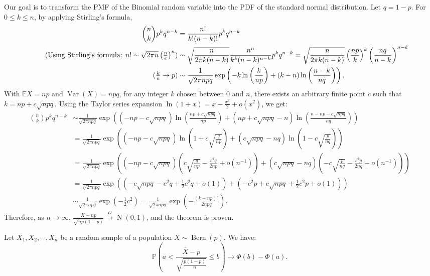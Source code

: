 \documentclass{huhtakm-template-book-v2}
\newcommand{\prob}{\mathbb{P}}
\newcommand{\expect}{\mathbb{E}}
\DeclareMathOperator{\Bern}{Bern}
\DeclareMathOperator{\N}{N}
\DeclareMathOperator{\Var}{Var}
\begin{document}
    \begin{proofing}
        Our goal is to transform the PMF of the Binomial random variable into the PDF of the standard normal distribution. Let $q = 1-p$. For $0 \leq k \leq n$, by applying Stirling's formula,
        \begin{align*}
            \binom{n}{k}p^{k}q^{n-k} &= \frac{n!}{k!(n-k)!}p^{k}q^{n-k}\\
            \tag{Using Stirling's formula: $n! \sim \sqrt{2\pi n}\left(\frac{n}{e}\right)^{n}$}
            &\sim \sqrt{\frac{n}{2\pi k(n-k)}}\frac{n^{n}}{k^{k}(n-k)^{n-k}}p^{k}q^{n-k} = \sqrt{\frac{n}{2\pi k(n-k)}}\left(\frac{np}{k}\right)^{k}\left(\frac{nq}{n-k}\right)^{n-k}\\
            \tag{$\frac{k}{n} \to p$}
            &\sim \frac{1}{\sqrt{2\pi npq}}\exp\left(-k\ln\left(\frac{k}{np}\right)+(k-n)\ln\left(\frac{n-k}{nq}\right)\right).
        \end{align*}
        With $\expect{X} = np$ and $\Var(X) = npq$, for any integer $k$ chosen between $0$ and $n$, there exists an arbitrary finite point $c$ such that $k = np+c\sqrt{npq}$. Using the Taylor series expansion $\ln(1+x) = x-\frac{x^{2}}{2}+o(x^{2})$, we get:
        \begin{align*}
            \binom{n}{k}p^{k}q^{n-k} &\sim \frac{1}{\sqrt{2\pi npq}}\exp\left((-np-c\sqrt{npq})\ln\left(\frac{np+c\sqrt{npq}}{np}\right)+(np+c\sqrt{npq}-n)\ln\left(\frac{n-np-c\sqrt{npq}}{nq}\right)\right)\\
            &= \frac{1}{\sqrt{2\pi npq}}\exp\left((-np-c\sqrt{npq})\ln\left(1+c\sqrt{\frac{q}{np}}\right)+(c\sqrt{npq}-nq)\ln\left(1-c\sqrt{\frac{p}{nq}}\right)\right)\\
            &= \frac{1}{\sqrt{2\pi npq}}\exp\left((-np-c\sqrt{npq})\left(c\sqrt{\frac{q}{np}}-\frac{c^{2}q}{2np}+o(n^{-1})\right)+(c\sqrt{npq}-nq)\left(-c\sqrt{\frac{p}{nq}}-\frac{c^{2}p}{2nq}+o(n^{-1})\right)\right)\\
            &= \frac{1}{\sqrt{2\pi npq}}\exp\left((-c\sqrt{npq}-c^{2}q+\frac{1}{2}c^{2}q+o(1))+(-c^{2}p+c\sqrt{npq}+\frac{1}{2}c^{2}p+o(1))\right)\\
            &\sim \frac{1}{\sqrt{2\pi npq}}\exp\left(-\frac{1}{2}c^{2}\right) = \frac{1}{\sqrt{2\pi npq}}\exp\left(-\frac{(k-np)^{2}}{2npq}\right).
        \end{align*}
        Therefore, as $n \to \infty$, $\frac{X-np}{\sqrt{np(1-p)}} \xrightarrow{D} \N(0,1)$, and the theorem is proven.
    \end{proofing}
    \begin{rem}
        Let $X_{1},X_{2},\cdots,X_{n}$ be a random sample of a population $X \sim \Bern(p)$. We have:
        \begin{equation*}
            \prob\left(a < \frac{\overline{X}-p}{\sqrt{\frac{p(1-p)}{n}}} \leq b\right) \to \Phi(b)-\Phi(a).
        \end{equation*}
    \end{rem}
    \newpage
\end{document}
